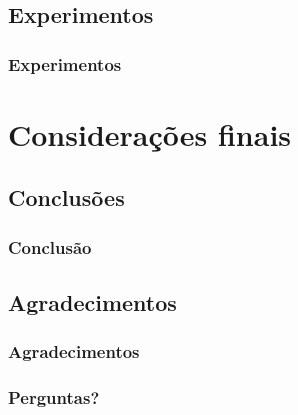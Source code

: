 \documentclass{beamer}
\begin{document}
  \subsection{Experimentos}

  \begin{frame}
    \frametitle{Experimentos}

  \end{frame}

  \section{Considerações finais}

  \subsection{Conclusões}

  \begin{frame}
    \frametitle{Conclusão}

  \end{frame}

  \subsection{Agradecimentos}

  \begin{frame}
    \frametitle{Agradecimentos}

  \end{frame}

  \begin{frame}
    \frametitle{Perguntas?}

  \end{frame}
\end{document}

